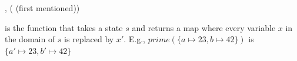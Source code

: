 \documentclass[landscape, a4paper]{article}
\begin{document}
\begin{minipage}[t]{0.2\linewidth}
\begin{betterlist}
\begin{betterlist}
			\item {}
			\item {},  ( (first mentioned))
		\end{betterlist}
		\item {}
		\begin{betterlist}
    \item \color{orange} is the function that takes a state $s$ and returns a map where every variable $x$ in the domain of $s$ is replaced by $x'$. E.g., $prime(\{a \mapsto 23, b \mapsto 42\})$ is $\{a' \mapsto 23, b' \mapsto 42\}$\color{black}
		\end{betterlist}


\end{betterlist}
\end{minipage}
\end{document}
